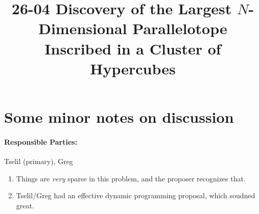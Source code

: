 \documentclass[11pt]{article}
\begin{document}
\title{26-04 Discovery of the Largest $N$-Dimensional Parallelotope
  Inscribed in a Cluster of Hypercubes}

\maketitle

\section{Some minor notes on discussion}

\paragraph{Responsible Parties:} Tselil (primary), Greg

\begin{enumerate}[1.]
\item Things are \emph{very} sparse in this problem, and the proposer
  recognizes that.
\item Tselil/Greg had an effective dynamic programming proposal, which
  soudned great.
\end{enumerate}
\end{document}
